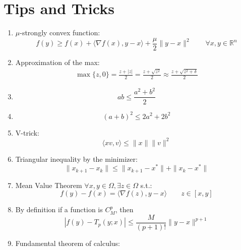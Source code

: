 \documentclass[12pt, openany]{report}
\newcommand{\R}{\mathbb{R}}
\theoremstyle{definition}
\begin{document}
\chapter{Tips and Tricks}\label{chap:tricks}
\begin{enumerate}
	\item $\mu$-strongly convex function:
	\begin{equation}
		f(y) \ge f(x) + \langle \nabla f(x),y-x\rangle + \frac{\mu}{2}\|y-x\|^2 \qquad \forall x,y\in \R^n
	\end{equation}
	\item Approximation of the max:
	\begin{equation}\label{eq:approx_max}
		\begin{aligned}
			\max\{z,0\} = \frac{z+|z|}{2} = \frac{z + \sqrt{z^2}}{2} \approx \frac{z + \sqrt{z^2 + \delta}}{2}
		\end{aligned}	
	\end{equation}
	\item \begin{equation}\label{eq:sq1}
		ab \leq \frac{a^2+b^2}{2}	
	\end{equation}
	\item \begin{equation}\label{eq:sq2}
		(a+b)^2 \leq 2a^2+2b^2
	\end{equation}
	\item V-trick:
	\begin{equation}\label{eq:vtrick}
		\langle xv,v\rangle \leq \|x\|\|v\|^2
	\end{equation}
	\item Triangular inequality by the minimizer: 
	\begin{equation}\label{eq:triangular_inequality_by_min}
		\|x_{k+1}-x_k\| \leq \|x_{k+1}-x^*\|+\|x_k-x^*\|
	\end{equation}
	\item Mean Value Theorem $\forall x,y \in \Omega, \exists z \in \Omega$ s.t.:
	\begin{equation}
		f(y)-f(x) = \langle \nabla f(z),y-x\rangle \qquad z \in [x,y]
	\end{equation}
	\item By definition if a function is $C^p_M$, then 
	\begin{equation}
		|f(y) - T_p(y;x)| \leq \frac{M}{(p+1)!}\|y-x\|^{p+1}
	\end{equation}
	\item Fundamental theorem of calculus:	
	\begin{equation}

\end{equation}
\end{enumerate}
\end{document}
